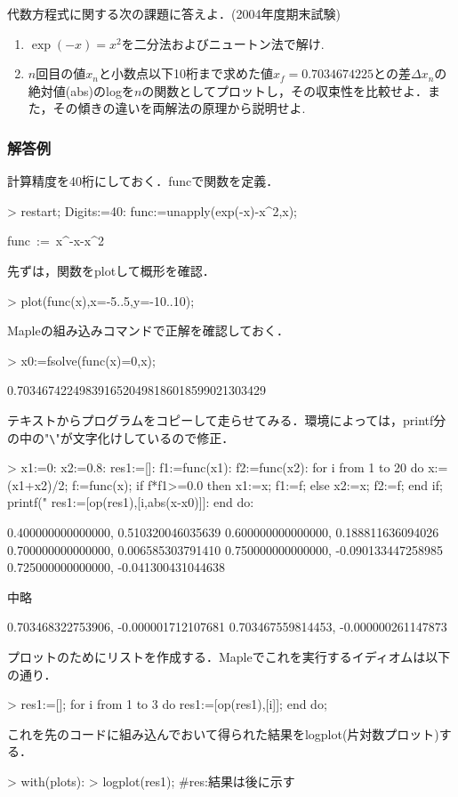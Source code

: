 代数方程式に関する次の課題に答えよ．(2004年度期末試験)
\begin{enumerate}
\item $\exp(-x) = x^2$を二分法およびニュートン法で解け.
\item $n$回目の値$x_n$と小数点以下10桁まで求めた値$x_f=0.7034674225$との差$\Delta x_n$の絶対値(abs)のlogを$n$の関数としてプロットし，その収束性を比較せよ．また，その傾きの違いを両解法の原理から説明せよ.
\end{enumerate}

\subsubsection{解答例}
計算精度を40桁にしておく．funcで関数を定義．
\begin{MapleInput}
> restart; Digits:=40: func:=unapply(exp(-x)-x^2,x);
\end{MapleInput}
\begin{MapleOutput}
func\, := \,x^{-x}-{x}^{2}
\end{MapleOutput}
先ずは，関数をplotして概形を確認．
\begin{MapleInput}
> plot(func(x),x=-5..5,y=-10..10);
\end{MapleInput}
Mapleの組み込みコマンドで正解を確認しておく．
\begin{MapleInput}
> x0:=fsolve(func(x)=0,x);
\end{MapleInput}
\begin{MapleOutput}
0.7034674224983916520498186018599021303429
\end{MapleOutput}
テキストからプログラムをコピーして走らせてみる．環境によっては，printf分の中の"\verb|\|"が文字化けしているので修正．
\begin{MapleInput}
> x1:=0: x2:=0.8: res1:=[]:
  f1:=func(x1): f2:=func(x2):
  for i from 1 to 20 do
    x:=(x1+x2)/2;
    f:=func(x);
    if f*f1>=0.0 then
      x1:=x; f1:=f;
    else
      x2:=x; f2:=f;
    end if;
    printf("%
    res1:=[op(res1),[i,abs(x-x0)]]:
  end do:
\end{MapleInput}
\begin{MapleError}
0.400000000000000, 0.510320046035639 
0.600000000000000, 0.188811636094026
0.700000000000000, 0.006585303791410 
0.750000000000000, -0.090133447258985
0.725000000000000, -0.041300431044638 

中略

0.703468322753906, -0.000001712107681 
0.703467559814453, -0.000000261147873
\end{MapleError}
プロットのためにリストを作成する．Mapleでこれを実行するイディオムは以下の通り．
\begin{MapleInput}
> res1:=[];
  for i from 1 to 3 do
    res1:=[op(res1),[i]];
  end do;
\end{MapleInput}
これを先のコードに組み込んでおいて得られた結果をlogplot(片対数プロット)する．
\begin{MapleInput}
> with(plots): 
> logplot(res1); #res:結果は後に示す
\end{MapleInput}

